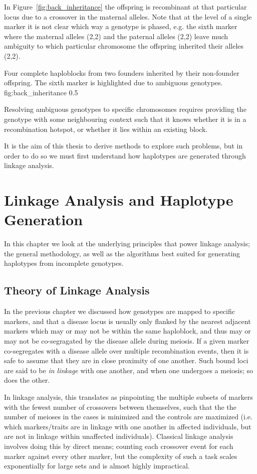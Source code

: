 In Figure~\ref{fig:back_inheritance} the offspring is recombinant at that particular locus due to a crossover in the maternal alleles. Note that at the level of a single marker it is not clear which way a genotype is phased, e.g. the sixth marker where the maternal alleles (2,2) and the paternal alleles (2,2) leave much ambiguity to which particular chromosome the offspring inherited their alleles (2,2).

	{Four complete haploblocks from two founders inherited by their non-founder offspring. The sixth marker is highlighted due to ambiguous genotypes.}
	{fig:back_inheritance}
	{0.5}

Resolving ambiguous genotypes to specific chromosomes requires providing the genotype with some neighbouring context such that it knows whether it is in a recombination hotspot, or whether it lies within an existing block.  

It is the aim of this thesis to derive methods to explore such problems,  but in order to do so we must first understand how haplotypes are generated through linkage analysis.

\section{Linkage Analysis and Haplotype Generation}

In this chapter we look at the underlying principles that power linkage analysis; the general methodology, as well as the algorithms best suited for generating haplotypes from incomplete genotypes.

\subsection{Theory of Linkage Analysis}

In the previous chapter we discussed how genotypes are mapped to specific markers, and that a disease locus is usually only flanked by the nearest adjacent markers which may or may not be within the same haploblock, and thus may or may not be co-segragated by the disease allele during meiosis.
If a given marker co-segregates with a disease allele over multiple recombination events, then it is safe to assume that they are in close proximity of one another. Such bound loci are said to be \textit{in linkage} with one another, and when one undergoes a meiosis; so does the other.

In linkage analysis, this translates as pinpointing the multiple subsets of markers with the fewest number of crossovers between themselves, such that the the number of meioses in the cases is minimized and the controls are maximized (i.e. which markers/traits are in linkage with one another in affected individuals, but are not in linkage within unaffected individuals).
Classical linkage analysis involves doing this by direct means; counting each crossover event for each marker against every other marker, but the complexity of such a task scales exponentially for large sets and is almost highly impractical.

